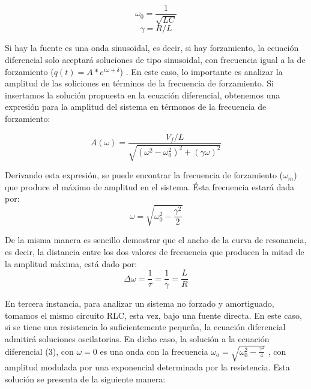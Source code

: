 \documentclass[%
 reprint,
 amsmath,amssymb,
 aps,
]{revtex4-1}
\begin{document}
\begin{equation}
\omega_0 = \frac{1}{\sqrt{LC}}
\end{equation}
\begin{equation}
\gamma = R/L
\end{equation}

Si hay la fuente es una onda sinusoidal, es decir, si hay forzamiento, la ecuaci\'on diferencial solo aceptar\'a soluciones de tipo sinusoidal, con frecuencia igual a la de forzamiento ($q(t) = A*e^{i\omega + \delta}$) . En este caso, lo importante es analizar la amplitud de las soliciones en t\'erminos de la frecuencia de forzamiento. Si insertamos la soluci\'on propuesta en la ecuaci\'on diferencial, obtenemos una expresi\'on para la amplitud del sistema en t\'ermonos de la frecuencia de forzamiento:

\begin{equation}
A(\omega) = \frac{V_f/L}{\sqrt{(\omega^2 - \omega_0^2)^2 + (\gamma\omega)^2}}
\label{equation:amplitud}
\end{equation}

Derivando esta expresi\'on, se puede encontrar la frecuencia de forzamiento ($\omega_m$) que produce el m\'aximo de amplitud en el sistema. \'Esta frecuencia estar\'a dada por:\\

\begin{equation}
\omega = \sqrt{\omega_0^2 - \frac{\gamma^2}{2} }
\end{equation}

De la misma manera es sencillo demostrar que el ancho de la curva de resonancia, es decir, la distancia entre los dos valores de frecuencia que producen la mitad de la amplitud m\'axima, est\'a dado por:\\

\begin{equation}
\Delta\omega = \frac{1}{\tau} = \frac{1}{\gamma} = \frac{L}{R}
\end{equation}

En tercera instancia, para analizar un sistema no forzado y amortiguado, tomamos el mismo circuito RLC, esta vez, bajo una fuente directa. En este caso, si se tiene una resistencia lo suficientemente pequeña, la ecuaci\'on diferencial admitir\'a soluciones oscilatorias. En dicho caso, la solución a la ecuaci\'on diferencial (3), con $\omega = 0$  es una onda con la frecuencia $\omega_a = \sqrt{\omega_0^2 -\frac{\gamma^2}{4}}$ , con amplitud modulada por una exponencial determinada por la resistencia. Esta soluci\'on se presenta de la siguiente manera:\\
\end{document}
